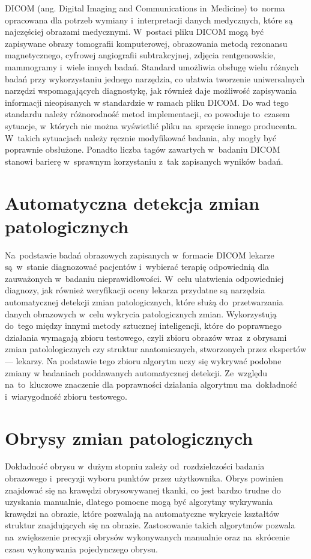 \documentclass[a4paper,11pt,twoside,openright]{report}
\theoremstyle{definition}
\begin{document}
DICOM (ang. Digital Imaging and Communications in~Medicine) \cite{DICOM} to~norma
opracowana dla potrzeb wymiany i~interpretacji danych medycznych, które są
najczęściej obrazami medycznymi. W~postaci pliku DICOM mogą być zapisywane obrazy
tomografii komputerowej, obrazowania metodą rezonansu magnetycznego, cyfrowej
angiografii subtrakcyjnej, zdjęcia rentgenowskie, mammogramy i~wiele innych badań.
Standard umożliwia obsługę wielu różnych badań przy wykorzystaniu jednego narzędzia,
co ułatwia tworzenie uniwersalnych narzędzi wspomagających diagnostykę, jak również
daje możliwość zapisywania informacji nieopisanych w standardzie w ramach pliku DICOM.
Do wad tego standardu należy różnorodność metod implementacji, co powoduje to~czasem
sytuacje, w~których nie można wyświetlić pliku na~sprzęcie innego producenta.
W~takich sytuacjach należy ręcznie
modyfikować badania, aby mogły być poprawnie obsłużone. Ponadto liczba tagów zawartych w~badaniu
DICOM stanowi barierę w~sprawnym korzystaniu z~tak zapisanych wyników badań.

\section {Automatyczna detekcja zmian patologicznych}

Na~podstawie badań obrazowych zapisanych w~formacie DICOM lekarze są~w~stanie diagnozować
pacjentów i~wybierać terapię odpowiednią dla zauważonych w~badaniu nieprawidłowości.
W~celu ułatwienia odpowiedniej diagnozy, jak również weryfikacji oceny lekarza
przydatne są narzędzia automatycznej detekcji zmian patologicznych,
które służą do~przetwarzania danych obrazowych w~celu
wykrycia patologicznych zmian. Wykorzystują do~tego między innymi metody sztucznej
inteligencji, które do poprawnego działania wymagają zbioru testowego, czyli zbioru obrazów
wraz~z obrysami zmian patolologicznych czy struktur anatomicznych, stworzonych przez
ekspertów --- lekarzy. Na podstawie tego zbioru algorytm uczy się
wykrywać podobne zmiany w badaniach poddawanych automatycznej detekcji.
Ze~względu na~to~kluczowe znaczenie dla poprawności działania algorytmu ma~dokładność i~wiarygodność zbioru testowego.

\section {Obrysy zmian patologicznych}

Dokładność obrysu w~dużym stopniu zależy od~rozdzielczości badania obrazowego i~precyzji
wyboru punktów przez użytkownika. Obrys powinien znajdować się na krawędzi
obrysowywanej tkanki, co jest bardzo trudne do uzyskania manualnie,
dlatego pomocne mogą być algorytmy wykrywania krawędzi na obrazie, które pozwalają na automatyczne
wykrycie kształtów struktur znajdujących się na obrazie. Zastosowanie takich algorytmów
pozwala na~zwiększenie precyzji obrysów wykonywanych manualnie oraz na~skrócenie
czasu wykonywania pojedynczego obrysu.
\end{document}
